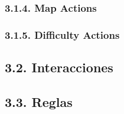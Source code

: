 \documentclass{article}
\begin{document}
\subsubsection{3.1.4. Map Actions}

\subsubsection{3.1.5. Difficulty Actions}

\subsection{3.2. Interacciones}

\subsection{3.3. Reglas}

\end{document}
